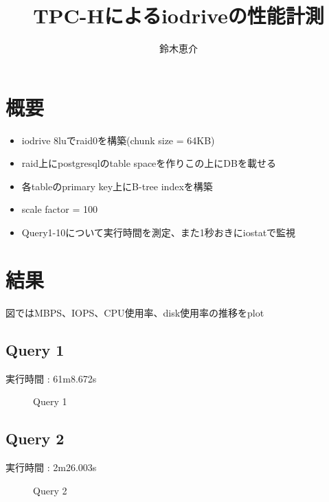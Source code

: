 \documentclass[11pt,a4paper]{jsarticle}
\title{TPC-Hによるiodriveの性能計測}
\author{鈴木恵介}
\newlength{\subfigwidth}
\newlength{\subfigcolsep}
\begin{document}
\maketitle
\section{概要}
\begin{itemize}
 \item iodrive 8luでraid0を構築(chunk size = 64KB)
 \item raid上にpostgresqlのtable spaceを作りこの上にDBを載せる
 \item 各tableのprimary key上にB-tree indexを構築
 \item scale factor = 100
 \item Query1-10について実行時間を測定、また1秒おきにiostatで監視
\end{itemize}

\section{結果}
図ではMBPS、IOPS、CPU使用率、disk使用率の推移をplot

\newpage
\subsection{Query 1}
実行時間 : 61m8.672s

\begin{figure}[bthp]
 \setlength{\subfigwidth}{.5\linewidth}
 \addtolength{\subfigwidth}{-.5\subfigcolsep}
 \begin{minipage}[b]{\subfigwidth}
 \end{minipage}
 \begin{minipage}[b]{\subfigwidth}
 \end{minipage}
  \caption{Query 1}
  \label{fig:q1}
\end{figure}

\subsection{Query 2}
実行時間 : 2m26.003s

\begin{figure}[bthp]
 \setlength{\subfigwidth}{.5\linewidth}
 \addtolength{\subfigwidth}{-.5\subfigcolsep}
 \begin{minipage}[b]{\subfigwidth}
 \end{minipage}
 \begin{minipage}[b]{\subfigwidth}
 \end{minipage}
  \caption{Query 2}
  \label{fig:q2}
\end{figure}
\end{document}
